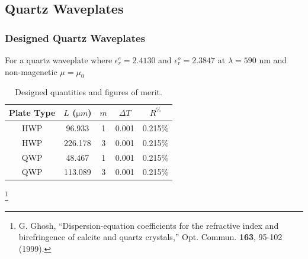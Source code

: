 \documentclass[aspectratio=169,t,xcolor=table]{beamer}
\newcommand\blfootnote[1]{%
  \begingroup
  \renewcommand\thefootnote{}\footnote[frame]{\tiny #1}%
  \addtocounter{footnote}{-1}%
  \endgroup
}
\begin{document}
        \subsection{Quartz Waveplates}
        \begin{frame}
            \frametitle{Designed Quartz Waveplates}
            For a quartz waveplate where $\epsilon_r^e=2.4130$ and 
            $\epsilon^o_r = 2.3847$ at $\lambda=590$ nm and non-magenetic 
            $\mu=\mu_0$ \cite{GHOSH199995}
            \begin{table}[h]
                \centering
                \begin{tabular}{ccccc}
                  Plate Type & $L$ ($\si{\micro m}$) & $m$ & $\Delta T$ & $R^\%$\\\hline \hline
                  HWP & 96.933 & 1 & 0.001 & 0.215\%\\\hline
                  HWP & 226.178 & 3 & 0.001 & 0.215\%\\\hline
                  QWP & 48.467 & 1 & 0.001 & 0.215\%\\\hline
                  QWP & 113.089 & 3 & 0.001 & 0.215\%\\\hline
                \end{tabular}
                \caption{Designed quantities and figures of merit.}
                \label{tb:Vals}
              \end{table}
              \blfootnote{\tiny
                \cite{GHOSH199995} 
                G. Ghosh, ``Dispersion-equation coefficients for the refractive 
                index and birefringence of calcite and quartz crystals,'' Opt. Commun.
                \textbf{163}, 95-102 (1999).
              }
        \end{frame}
\end{document}
